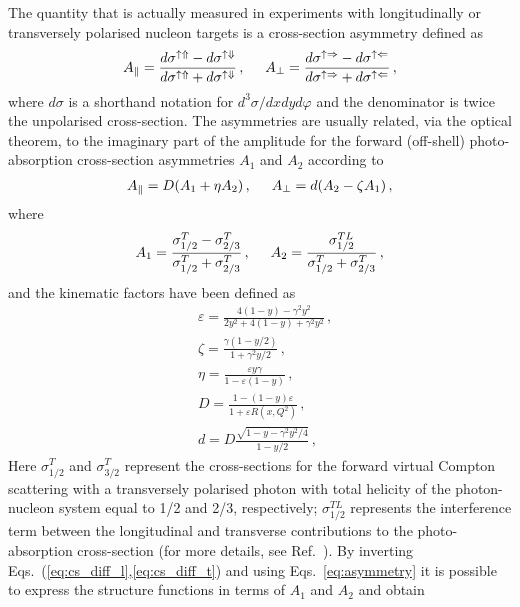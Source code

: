 The quantity that is actually measured in experiments with longitudinally or transversely polarised nucleon targets is a cross-section asymmetry defined as
\begin{equation}
  A_{\parallel} = \frac{d\sigma^{\uparrow \Uparrow} - d\sigma^{\uparrow \Downarrow}}{d\sigma^{\uparrow \Uparrow} + d\sigma^{\uparrow \Downarrow}} \,, \hspace{5mm}  A_{\perp} = \frac{d\sigma^{\uparrow \Rightarrow} - d\sigma^{\uparrow \Leftarrow}}{d\sigma^{\uparrow \Rightarrow} + d\sigma^{\uparrow \Leftarrow}} \,,
  \label{eq:asymmetry}
\end{equation}
where $d\sigma$ is a shorthand notation for $d^3\sigma/dxdyd\varphi$ and the denominator is twice the unpolarised cross-section. The asymmetries are usually related, via the optical theorem, to the imaginary part of the amplitude for the forward (off-shell) photo-absorption cross-section asymmetries $A_1$ and $A_2$ according to
\begin{align}
  A_{\parallel} = D(A_1 + \eta A_2)\,, \hspace{5mm} A_{\perp} = d(A_2 - \zeta A_1)\,,
\end{align}
where 
\begin{equation}
  A_1 = \frac{\sigma_{1/2}^T - \sigma_{2/3}^T}{\sigma_{1/2}^T + \sigma_{2/3}^T} \,, \hspace{5mm} A_2 = \frac{\sigma_{1/2}^{TL}}{\sigma_{1/2}^T + \sigma_{2/3}^T}\,,
\end{equation}
and the kinematic factors have been defined as 
\begin{align}
  & \varepsilon = \frac{4(1-y) - \gamma^2 y^2}{2 y^2 + 4(1-y) + \gamma^2 y^2} \,,\\
  & \zeta = \frac{\gamma(1 - y/2)}{1 + \gamma^2y/2} \,,\\
  & \eta = \frac{\varepsilon y \gamma}{1 - \varepsilon(1 - y)} \,,\\
  & D = \frac{1 - (1 - y)\varepsilon }{1 + \varepsilon R (x,Q^2)} \,,\\
  & d = D \frac{\sqrt{1 - y - \gamma^2 y^2 /4}}{1 - y/2}\,,
\end{align}
Here $\sigma_{1/2}^T$ and $\sigma_{3/2}^T$ represent the cross-sections for the forward virtual Compton scattering with a transversely polarised photon with total helicity of the photon-nucleon system equal to 1/2 and 2/3, respectively; $\sigma_{1/2}^{TL}$ represents the interference term between the longitudinal and transverse contributions to the photo-absorption cross-section (for more details, see Ref.~\cite{leader_predazzi_1996}). By inverting Eqs.~(\ref{eq:cs_diff_l},\ref{eq:cs_diff_t}) and using Eqs.~\eqref{eq:asymmetry} it is possible to express the structure functions in terms of $A_1$ and $A_2$ and obtain
